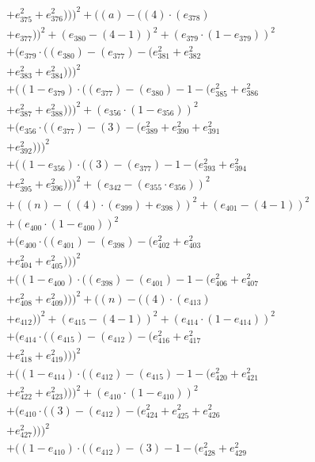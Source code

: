 \documentclass[10pt, a4paper]{article}
\begin{document}
\begin{small}
\begin{align*}
& + e_{375}^{2} + e_{376}^{2})))^{2} + ((a) - ((4)  \cdot  (e_{378}) \\
& + e_{377}))^{2} + (e_{380} - (4 - 1))^{2} + (e_{379}  \cdot  (1 - e_{379}))^{2} \\
& + (e_{379}  \cdot  ((e_{380}) - (e_{377}) - (e_{381}^{2} + e_{382}^{2} \\
& + e_{383}^{2} + e_{384}^{2})))^{2} \\
& + ((1 - e_{379})  \cdot  ((e_{377}) - (e_{380}) - 1 - (e_{385}^{2} + e_{386}^{2} \\
& + e_{387}^{2} + e_{388}^{2})))^{2} + (e_{356}  \cdot  (1 - e_{356}))^{2} \\
& + (e_{356}  \cdot  ((e_{377}) - (3) - (e_{389}^{2} + e_{390}^{2} + e_{391}^{2} \\
& + e_{392}^{2})))^{2} \\
& + ((1 - e_{356})  \cdot  ((3) - (e_{377}) - 1 - (e_{393}^{2} + e_{394}^{2} \\
& + e_{395}^{2} + e_{396}^{2})))^{2} + (e_{342} - (e_{355}  \cdot  e_{356}))^{2} \\
& + ((n) - ((4)  \cdot  (e_{399}) + e_{398}))^{2} + (e_{401} - (4 - 1))^{2} \\
& + (e_{400}  \cdot  (1 - e_{400}))^{2} \\
& + (e_{400}  \cdot  ((e_{401}) - (e_{398}) - (e_{402}^{2} + e_{403}^{2} \\
& + e_{404}^{2} + e_{405}^{2})))^{2} \\
& + ((1 - e_{400})  \cdot  ((e_{398}) - (e_{401}) - 1 - (e_{406}^{2} + e_{407}^{2} \\
& + e_{408}^{2} + e_{409}^{2})))^{2} + ((n) - ((4)  \cdot  (e_{413}) \\
& + e_{412}))^{2} + (e_{415} - (4 - 1))^{2} + (e_{414}  \cdot  (1 - e_{414}))^{2} \\
& + (e_{414}  \cdot  ((e_{415}) - (e_{412}) - (e_{416}^{2} + e_{417}^{2} \\
& + e_{418}^{2} + e_{419}^{2})))^{2} \\
& + ((1 - e_{414})  \cdot  ((e_{412}) - (e_{415}) - 1 - (e_{420}^{2} + e_{421}^{2} \\
& + e_{422}^{2} + e_{423}^{2})))^{2} + (e_{410}  \cdot  (1 - e_{410}))^{2} \\
& + (e_{410}  \cdot  ((3) - (e_{412}) - (e_{424}^{2} + e_{425}^{2} + e_{426}^{2} \\
& + e_{427}^{2})))^{2} \\
& + ((1 - e_{410})  \cdot  ((e_{412}) - (3) - 1 - (e_{428}^{2} + e_{429}^{2} \\

\end{align*}
\end{small}
\end{document}
